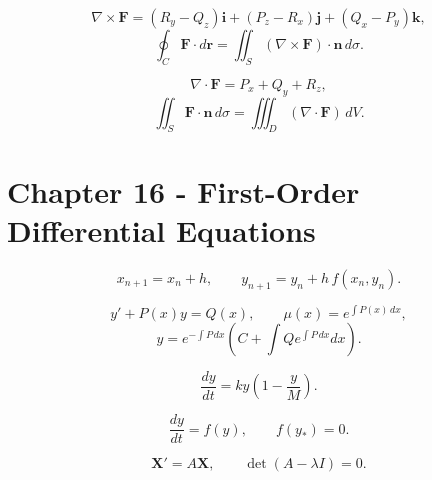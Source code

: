 \[
  \nabla\times\mathbf F
  =
  (R_y-Q_z)\mathbf i+(P_z-R_x)\mathbf j+(Q_x-P_y)\mathbf k,
\]
\[
  \oint_C \mathbf F\cdot d\mathbf r
  =
  \iint_S(\nabla\times\mathbf F)\cdot\mathbf n\,d\sigma.
\]

\[
  \nabla\cdot\mathbf F=P_x+Q_y+R_z,
\]
\[
  \iint_S \mathbf F\cdot\mathbf n\,d\sigma
  =
  \iiint_D(\nabla\cdot\mathbf F)\,dV.
\]

\section*{Chapter 16 - First-Order Differential Equations}

\[
  x_{n+1}=x_n+h,
  \qquad
  y_{n+1}=y_n+h\,f(x_n,y_n).
\]

\[
  y'+P(x)y=Q(x),
  \qquad
  \mu(x)=e^{\int P(x)\,dx},
\]
\[
  y=e^{-\int P\,dx}
  \left(C+\int Q e^{\int P\,dx}dx\right).
\]

\[
  \frac{dy}{dt}=ky\left(1-\frac yM\right).
\]

\[
  \frac{dy}{dt}=f(y),
  \qquad
  f(y_*)=0.
\]

\[
  \mathbf X'=A\mathbf X,
  \qquad
  \det(A-\lambda I)=0.
\]

